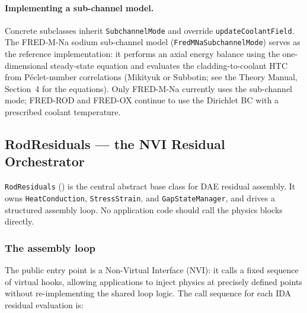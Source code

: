 \documentclass[11pt,a4paper]{article}
\begin{document}
\paragraph{Implementing a sub-channel model.}
Concrete subclasses inherit \texttt{SubchannelMode} and override \texttt{updateCoolantField}.  The FRED-M-Na sodium sub-channel model (\texttt{FredMNaSubchannelMode}) serves as the reference implementation: it performs an axial energy balance using the one-dimensional steady-state equation and evaluates the cladding-to-coolant HTC from Péc\-let-number correlations (Mikityuk or Subbotin; see the Theory Manual, Section~4 for the equations). Only FRED-M-Na currently uses the sub-channel mode; FRED-ROD and FRED-OX continue to use the Dirichlet BC with a prescribed coolant temperature.

\subsection{RodResiduals — the NVI Residual Orchestrator}
\label{sec:rod_residuals}

\texttt{RodResiduals} () is the central abstract base class for DAE residual assembly.  It owns \texttt{HeatConduction}, \texttt{StressStrain}, and \texttt{GapStateManager}, and drives a structured assembly loop.  No application code should call the physics blocks directly.

\subsubsection*{The assembly loop}

The public entry point  is a Non-Virtual Interface (NVI): it calls a fixed sequence of virtual hooks, allowing applications to inject physics at precisely defined points without re-implementing the shared loop logic.  The call sequence for each IDA residual evaluation is:
\end{document}
